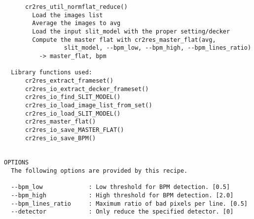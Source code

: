 \begin{verbatim}
      cr2res_util_normflat_reduce()                                       
        Load the images list                                              
        Average the images to avg                                         
        Load the input slit_model with the proper setting/decker          
        Compute the master flat with cr2res_master_flat(avg,              
                 slit_model, --bpm_low, --bpm_high, --bpm_lines_ratio)    
          -> master_flat, bpm                                             
                                                                          
  Library functions used:                                                 
      cr2res_extract_frameset()                                           
      cr2res_io_extract_decker_frameset()                                 
      cr2res_io_find_SLIT_MODEL()                                         
      cr2res_io_load_image_list_from_set()                                
      cr2res_io_load_SLIT_MODEL()                                         
      cr2res_master_flat()                                                
      cr2res_io_save_MASTER_FLAT()                                        
      cr2res_io_save_BPM()                                                
  

OPTIONS
  The following options are provided by this recipe.

  --bpm_low             : Low threshold for BPM detection. [0.5]
  --bpm_high            : High threshold for BPM detection. [2.0]
  --bpm_lines_ratio     : Maximum ratio of bad pixels per line. [0.5]
  --detector            : Only reduce the specified detector. [0]

\end{verbatim}
